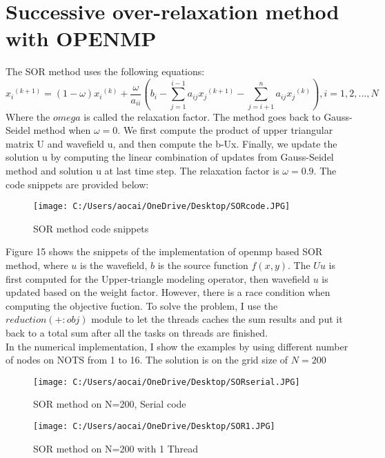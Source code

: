 \documentclass[12pt]{article}
\begin{document}
\section{Successive over-relaxation method with OPENMP}
The SOR method uses the following equations:
$${x_i}^{(k+1)} = (1-\omega){x_i}^{(k)} + \frac{\omega}{a_{ii}} \left( b_i - \sum_{j=1}^{i-1}a_{ij}{x_j}^{(k+1)} -\sum_{j=i+1}^{n}a_{ij}{x_j}^{(k)} \right), i= 1,2,...,N$$
Where the $omega$ is called the relaxation factor. The method goes back to Gauss-Seidel method when $\omega=0$. We first compute the product of upper triangular matrix U and wavefield u, and then compute the b-Ux. Finally, we update the solution u by computing the linear combination of updates from Gauss-Seidel method and solution u at last time step. The relaxation factor is $\omega = 0.9$. The code snippets are provided below:

\begin{figure}[H]
	\centering
	\texttt{[image: C:/Users/aocai/OneDrive/Desktop/SORcode.JPG]}
	\caption[Optional caption]{SOR method code snippets}
	\label{fig:sor}
\end{figure}

Figure 15 shows the snippets of the implementation of openmp based SOR method, where $u$ is the wavefield, $b$ is the source function $f(x,y)$. The $Uu$ is first computed for the Upper-triangle modeling operator, then wavefield $u$ is updated based on the weight factor. However, there is a race condition when computing the objective fuction. To solve the problem, I use the $reduction(+:obj)$ module to let the threads caches the sum results and put it back to a total sum after all the tasks on threads are finished.\\

In the numerical implementation, I show the examples by using different number of nodes on NOTS from 1 to 16. The solution is on the grid size of $N=200$

\begin{figure}[H]
	\centering
	\texttt{[image: C:/Users/aocai/OneDrive/Desktop/SORserial.JPG]}
	\caption[Optional caption]{SOR method on N=200, Serial code}
	\label{fig:SORs}
\end{figure}

\begin{figure}[H]
	\centering
	\texttt{[image: C:/Users/aocai/OneDrive/Desktop/SOR1.JPG]}
	\caption[Optional caption]{SOR method on N=200 with 1 Thread}
	\label{fig:SOR1}
\end{figure}
\end{document}

